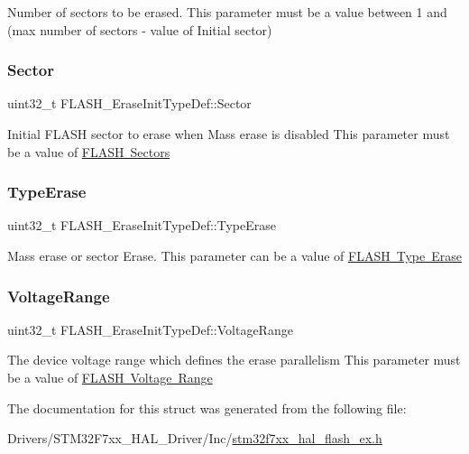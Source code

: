 Number of sectors to be erased. This parameter must be a value between 1 and (max number of sectors -\/ value of Initial sector) \mbox{\label{struct_f_l_a_s_h___erase_init_type_def_a13bac8f9a1ba504a265b44345ecf4d2b}} 
\subsubsection{\texorpdfstring{Sector}{Sector}}
{\footnotesize\ttfamily uint32\+\_\+t F\+L\+A\+S\+H\+\_\+\+Erase\+Init\+Type\+Def\+::\+Sector}

Initial F\+L\+A\+SH sector to erase when Mass erase is disabled This parameter must be a value of \mbox{\hyperlink{group___f_l_a_s_h_ex___sectors}{F\+L\+A\+SH Sectors}} \mbox{\label{struct_f_l_a_s_h___erase_init_type_def_a5d08471046a663db76d2252848a7d66c}} 
\subsubsection{\texorpdfstring{TypeErase}{TypeErase}}
{\footnotesize\ttfamily uint32\+\_\+t F\+L\+A\+S\+H\+\_\+\+Erase\+Init\+Type\+Def\+::\+Type\+Erase}

Mass erase or sector Erase. This parameter can be a value of \mbox{\hyperlink{group___f_l_a_s_h_ex___type___erase}{F\+L\+A\+SH Type Erase}} \mbox{\label{struct_f_l_a_s_h___erase_init_type_def_a3a2a0c2c4ed573bb84c768c6dbb92cc9}} 
\subsubsection{\texorpdfstring{VoltageRange}{VoltageRange}}
{\footnotesize\ttfamily uint32\+\_\+t F\+L\+A\+S\+H\+\_\+\+Erase\+Init\+Type\+Def\+::\+Voltage\+Range}

The device voltage range which defines the erase parallelism This parameter must be a value of \mbox{\hyperlink{group___f_l_a_s_h_ex___voltage___range}{F\+L\+A\+SH Voltage Range}} 

The documentation for this struct was generated from the following file\+:\begin{DoxyCompactItemize}
\item 
Drivers/\+S\+T\+M32\+F7xx\+\_\+\+H\+A\+L\+\_\+\+Driver/\+Inc/\mbox{\hyperlink{stm32f7xx__hal__flash__ex_8h}{stm32f7xx\+\_\+hal\+\_\+flash\+\_\+ex.\+h}}\end{DoxyCompactItemize}
